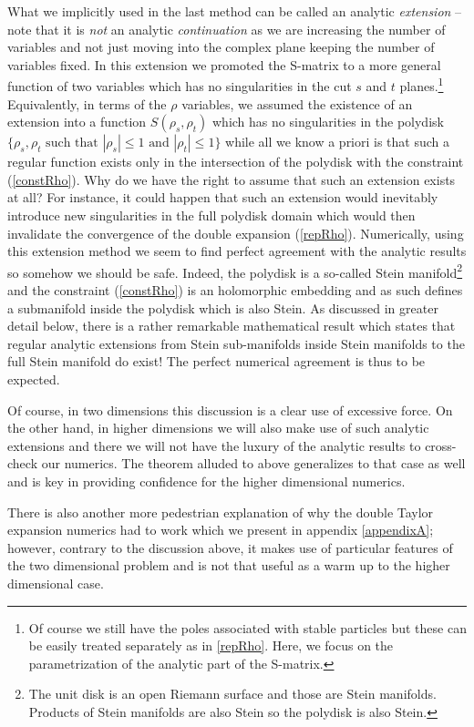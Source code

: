 \documentclass[12pt]{article}
\newcommand{\<}{{\langle}}
\renewcommand{\>}{{\rangle}}
\begin{document}
What we implicitly used in the last method can be called an analytic \textit{extension} -- note that it is \textit{not} an analytic \textit{continuation} as we are increasing the number of variables and not just moving into the complex plane keeping the number of variables fixed. In this extension we promoted the S-matrix to a more general function of two variables which has no singularities in the cut $s$ and $t$ planes.\footnote{Of course we still have the poles associated with stable particles but these can be easily treated separately as in \eqref{repRho}. Here, we focus on the parametrization of the analytic part of the S-matrix.}
Equivalently, in terms of the $\rho$ variables, we assumed the existence of an extension into a function $S(\rho_s,\rho_t)$ which has no singularities in the polydisk $\{\rho_s,\rho_t \text{ such that } |\rho_s|\le 1 \text{ and } |\rho_t| \le 1\}$ while all we know a priori is that such a regular function exists only in the intersection of the polydisk with the constraint (\ref{constRho}). Why do we have the right to assume that such an extension exists at all? For instance, it could happen that such an extension would inevitably introduce new singularities in the full polydisk domain which would then invalidate the convergence of the double expansion (\ref{repRho}). Numerically, using this extension method we seem to find perfect agreement with the analytic results so somehow we should be safe. Indeed, the polydisk is a so-called Stein manifold\footnote{The unit disk is an open Riemann surface and those are Stein manifolds. Products of Stein manifolds are also Stein so the polydisk is also Stein.} and the constraint (\ref{constRho}) is an holomorphic embedding and as such defines a submanifold inside the polydisk which is also Stein. As discussed in greater detail below, there is a rather remarkable mathematical result which states that regular analytic extensions from Stein sub-manifolds inside Stein manifolds to the full Stein manifold do exist! The perfect numerical agreement is thus to be expected. 

Of course, in two dimensions this discussion is a clear use of excessive force. On the other hand, in higher dimensions we will also make use of such analytic extensions and there we will not have the luxury of the analytic results to cross-check our numerics. The theorem alluded to above generalizes to that case as well and is key in providing confidence for the higher dimensional numerics. 

There is also another more pedestrian explanation of why the double Taylor expansion numerics had to work which we present in appendix \ref{appendixA}; however, contrary to the discussion above, it makes use of particular features of the two dimensional problem and is not that useful as a warm up to the higher dimensional case. 
\end{document}
